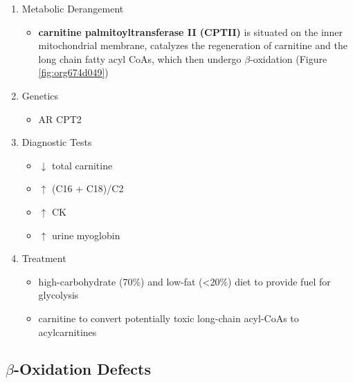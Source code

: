 \documentclass[12pt]{scrartcl}
\begin{document}
\begin{enumerate}
\item Metabolic Derangement
\label{sec:orgc654ead}
\begin{itemize}
\item \textbf{carnitine palmitoyltransferase II (CPTII)} is situated on the inner
mitochondrial membrane, catalyzes the regeneration of carnitine and
the long chain fatty acyl CoAs, which then undergo \(\beta\)-oxidation
(Figure \ref{fig:org674d049})
\end{itemize}
\item Genetics
\label{sec:org8eeefed}
\begin{itemize}
\item AR CPT2
\end{itemize}
\item Diagnostic Tests
\label{sec:org0e5f8c6}
\begin{itemize}
\item \(\downarrow\) total carnitine
\item \(\uparrow\) (C16 + C18)/C2
\item \(\uparrow\) CK
\item \(\uparrow\) urine myoglobin
\end{itemize}
\item Treatment
\label{sec:orge21eb4c}
\begin{itemize}
\item high-carbohydrate (70\%) and low-fat (<20\%) diet to provide fuel for glycolysis
\item carnitine to convert potentially toxic long-chain acyl-CoAs to
acylcarnitines
\end{itemize}
\end{enumerate}
\subsection{\(\beta\)-Oxidation Defects}
\label{sec:org646e7f1}
\end{document}
